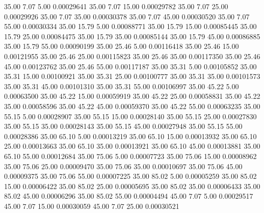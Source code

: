      35.00      7.07      5.00     0.00029641
     35.00      7.07     15.00     0.00029782
     35.00      7.07     25.00     0.00029926
     35.00      7.07     35.00     0.00030378
     35.00      7.07     45.00     0.00030520
     35.00      7.07     55.00     0.00030334
     35.00     15.79      5.00     0.00088771
     35.00     15.79     15.00     0.00085445
     35.00     15.79     25.00     0.00084475
     35.00     15.79     35.00     0.00085144
     35.00     15.79     45.00     0.00086885
     35.00     15.79     55.00     0.00090199
     35.00     25.46      5.00     0.00116418
     35.00     25.46     15.00     0.00121955
     35.00     25.46     25.00     0.00115823
     35.00     25.46     35.00     0.00117350
     35.00     25.46     45.00     0.00123762
     35.00     25.46     55.00     0.00117187
     35.00     35.31      5.00     0.00105852
     35.00     35.31     15.00     0.00100921
     35.00     35.31     25.00     0.00100777
     35.00     35.31     35.00     0.00101573
     35.00     35.31     45.00     0.00101310
     35.00     35.31     55.00     0.00106997
     35.00     45.22      5.00     0.00063500
     35.00     45.22     15.00     0.00059919
     35.00     45.22     25.00     0.00058831
     35.00     45.22     35.00     0.00058596
     35.00     45.22     45.00     0.00059370
     35.00     45.22     55.00     0.00063235
     35.00     55.15      5.00     0.00028907
     35.00     55.15     15.00     0.00028140
     35.00     55.15     25.00     0.00027830
     35.00     55.15     35.00     0.00028143
     35.00     55.15     45.00     0.00027948
     35.00     55.15     55.00     0.00028386
     35.00     65.10      5.00     0.00013219
     35.00     65.10     15.00     0.00013932
     35.00     65.10     25.00     0.00013663
     35.00     65.10     35.00     0.00013921
     35.00     65.10     45.00     0.00013881
     35.00     65.10     55.00     0.00012684
     35.00     75.06      5.00     0.00007723
     35.00     75.06     15.00     0.00008962
     35.00     75.06     25.00     0.00009470
     35.00     75.06     35.00     0.00010697
     35.00     75.06     45.00     0.00009375
     35.00     75.06     55.00     0.00007225
     35.00     85.02      5.00     0.00005259
     35.00     85.02     15.00     0.00006422
     35.00     85.02     25.00     0.00005695
     35.00     85.02     35.00     0.00006433
     35.00     85.02     45.00     0.00006296
     35.00     85.02     55.00     0.00004494
     45.00      7.07      5.00     0.00029517
     45.00      7.07     15.00     0.00030059
     45.00      7.07     25.00     0.00030521
